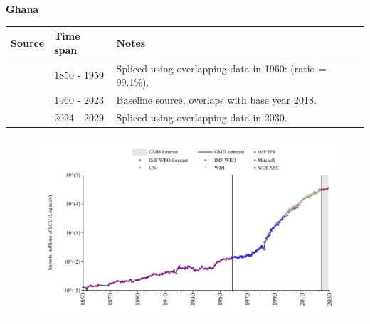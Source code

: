 \documentclass[12pt,a4paper,landscape]{article}
\begin{document}
\begin{adjustbox}{max totalsize={\paperwidth}{\paperheight},center}
\begin{minipage}[t][\textheight][t]{\textwidth}
\vspace*{0.5cm}
{}
\begin{center}
{\Large\bfseries Ghana}
\end{center}
\vspace{0.5cm}
\begin{table}[H]
\centering
\small
\begin{tabular}{|l|l|l|}
\hline
\textbf{Source} & \textbf{Time span} & \textbf{Notes} \\
\hline
\rowcolor{white}\cite{Mitchell}& 1850 - 1959 &Spliced using overlapping data in 1960: (ratio = 99.1\%).\\
\rowcolor{lightgray}\cite{WDI}& 1960 - 2023 &Baseline source, overlaps with base year 2018.\\
\rowcolor{white}\cite{IMF_WEO_forecast}& 2024 - 2029 &Spliced using overlapping data in 2030.\\
\hline
\end{tabular}
\end{table}
\begin{figure}[H]
\centering
\includegraphics[width=\textwidth,height=0.6\textheight,keepaspectratio]{graphs/GHA_imports.pdf}
\end{figure}
\end{minipage}
\end{adjustbox}
\end{document}

